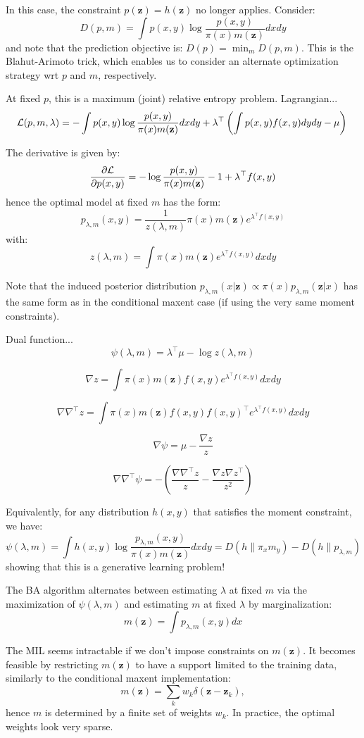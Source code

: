 \documentclass[english]{scrartcl}
\def\y{{\mathbf{y}}}
\def\y{{\mathbf{z}}}
\begin{document}
In this case, the constraint $p(\y)=h(\y)$ no longer applies. Consider:
$$
D(p,m) = \int p(x,y) \log \frac{p(x,y)}{\pi(x)m(\y)} dx dy
$$
and note that the prediction objective is: $D(p) = \min_m D(p,m)$. This is the Blahut-Arimoto trick, which enables us to consider an alternate optimization strategy wrt $p$ and $m$, respectively. 

At fixed $p$, this is a maximum (joint) relative entropy problem. Lagrangian...
$$
{\cal L}(p,m,\lambda)
=
- \int p(x,y) \log \frac{p(x,y)}{\pi(x)m(\y)} dxdy
+
\lambda^\top \left( 
\int p(x,y) f(x,y) dydy - \mu 
\right) \\
$$

The derivative is given by:
$$
\frac{\partial\cal L}{\partial p(x,y)}
= 
- \log \frac{p(x,y)}{\pi(x)m(\y)} - 1
+ \lambda^\top f(x,y)
$$
hence the optimal model at fixed $m$ has the form:
$$
p_{\lambda,m}(x,y) = \frac{1}{z(\lambda,m)} \pi(x) m(\y) e^{\lambda^\top f(x,y)} 
$$
with:
$$
z(\lambda,m) = \int \pi(x) m(\y) e^{\lambda^\top f(x,y)} dx dy
$$

Note that the induced posterior distribution $p_{\lambda,m}(x|\y)\propto \pi(x)p_{\lambda,m}(\y|x)$ has the same form as in the conditional maxent case (if using the very same moment constraints).

Dual function...
$$
\psi(\lambda,m) 
= \lambda^\top \mu - \log z(\lambda, m)
$$

$$
\nabla z = \int \pi(x) m(\y) f(x,y) e^{\lambda^\top f(x,y)} dx dy
$$

$$
\nabla\nabla^\top z = \int \pi(x)m(\y) f(x,y) f(x,y)^\top e^{\lambda^\top f(x,y)} dxdy
$$

$$
\nabla \psi = \mu - \frac{\nabla z}{z} 
$$

$$
\nabla\nabla^\top \psi = 
- \left(
\frac{\nabla \nabla^\top z}{z} 
- \frac{\nabla z \nabla z^\top}{z^2}
\right) 
$$

Equivalently, for any distribution $h(x,y)$ that satisfies the moment constraint, we have:
$$
\psi(\lambda,m) 
=
\int h(x,y) \log \frac{p_{\lambda,m}(x,y)}{\pi(x)m(\y)} dxdy
= D(h\|\pi_xm_y) - D(h\|p_{\lambda,m})
$$
showing that this is a generative learning problem!

The BA algorithm alternates between estimating $\lambda$ at fixed $m$ via the maximization of $\psi(\lambda,m)$ and estimating $m$ at fixed $\lambda$ by marginalization:
$$
m(\y) = \int p_{\lambda,m}(x,y) dx
$$

The MIL seems intractable if we don't impose constraints on $m(\y)$. It becomes feasible by restricting $m(\y)$ to have a support limited to the training data, similarly to the conditional maxent implementation:
$$
m(\y) = \sum_k w_k \delta(\y-\y_k),
$$
hence $m$ is determined by a finite set of weights $w_k$. In practice, the optimal weights look very sparse.
\end{document}

